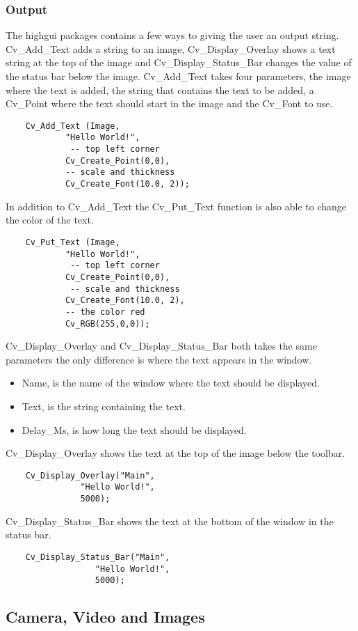 \subsubsection{Output}
The highgui packages contains a few ways to giving the user an output string. Cv_Add_Text adds a string to an image, Cv_Display_Overlay shows a text string at the top of the image and Cv_Display_Status_Bar changes the value of the status bar below the image.
Cv_Add_Text takes four parameters, the image where the text is added, the string that contains the text to be added, a Cv_Point where the text should start in the image and the Cv_Font to use.
\begin{lstlisting}
	Cv_Add_Text	(Image,
			"Hello World!",
			 -- top left corner
			Cv_Create_Point(0,0),
			-- scale and thickness
			Cv_Create_Font(10.0, 2));
\end{lstlisting}
In addition to Cv_Add_Text the Cv_Put_Text function is also able to change the color of the text.
\begin{lstlisting}
	Cv_Put_Text	(Image,
			"Hello World!",
			 -- top left corner
			Cv_Create_Point(0,0),
			 -- scale and thickness
			Cv_Create_Font(10.0, 2),
			-- the color red
			Cv_RGB(255,0,0)); 
\end{lstlisting}
Cv_Display_Overlay and Cv_Display_Status_Bar both takes the same parameters the only difference is where the text appears in the window.
\begin{itemize}
\item Name, is the name of the window where the text should be displayed.
\item Text, is the string containing the text.
\item Delay_Ms, is how long the text should be displayed.
\end{itemize}
Cv_Display_Overlay shows the text at the top of the image below the toolbar.
\begin{lstlisting}
	Cv_Display_Overlay("Main", 
			   "Hello World!", 
			   5000);
\end{lstlisting}
Cv_Display_Status_Bar shows the text at the bottom of the window in the status bar.
\begin{lstlisting}
	Cv_Display_Status_Bar("Main",
			      "Hello World!", 
			      5000);
\end{lstlisting}
\subsection{Camera, Video and Images}
